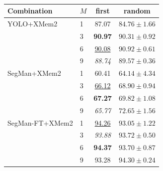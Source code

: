 \begin{table}[htb]
\centering
\footnotesize
\caption{}
\label{tab:masks_ablation}
\begin{tabular}{llcc}
\toprule
\textbf{Combination} & \textbf{$M$} & \textbf{first} & \textbf{random} \\
\midrule
YOLO+XMem2 & 1 & 87.07 & $84.76\pm1.66$ \\
 & 3 & \textbf{90.97} & $90.31\pm0.92$ \\
 & 6 & \uline{90.08} & $90.92\pm0.61$ \\
 & 9 & \textit{88.74} & $89.57\pm0.36$ \\
\midrule
SegMan+XMem2 & 1 & 60.41 & $64.14\pm4.34$ \\
 & 3 & \uline{66.12} & $68.90\pm0.94$ \\
 & 6 & \textbf{67.27} & $69.82\pm1.08$ \\
 & 9 & \textit{65.77} & $72.65\pm1.56$ \\
\midrule
SegMan-FT+XMem2 & 1 & \uline{94.26} & $93.05\pm1.22$ \\
 & 3 & \textit{93.88} & $93.72\pm0.50$ \\
 & 6 & \textbf{94.37} & $93.70\pm0.87$ \\
 & 9 & 93.28 & $94.30\pm0.24$ \\
\bottomrule
\end{tabular}
\end{table}
